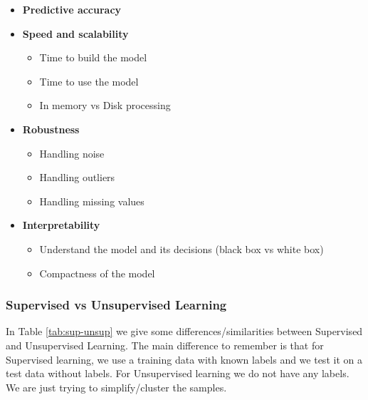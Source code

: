 \begin{itemize}
\item \textbf{Predictive accuracy}
\item \textbf{Speed and scalability} 
  \begin{itemize}
   \item Time to build the model
   \item Time to use the model
   \item In memory vs Disk processing
  \end{itemize}
\item \textbf{Robustness}
  \begin{itemize}
   \item Handling noise
   \item Handling outliers
   \item Handling missing values
  \end{itemize}
\item \textbf{Interpretability}
  \begin{itemize}
   \item Understand the model and its decisions (black box vs white box)
   \item Compactness of the model
  \end{itemize}
\end{itemize}

\subsubsection{Supervised vs Unsupervised Learning}

In Table \ref{tab:sup-unsup} we give some differences/similarities between Supervised and Unsupervised Learning. The main difference to remember is that for Supervised learning, we use a training data with known labels and we test it on a test data without labels. For Unsupervised learning we do not have any labels. We are just trying to simplify/cluster the samples.


